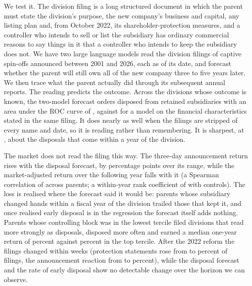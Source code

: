 We test it. The division filing is a long structured document in which the parent must state the division's purpose, the new company's business and capital, any listing plan and, from October 2022, its shareholder-protection measures, and a controller who intends to sell or list the subsidiary has ordinary commercial reasons to say things in it that a controller who intends to keep the subsidiary does not. We have two large language models read the division filings of \NScored{} captive spin-offs announced between 2001 and 2026, each as of its date, and forecast whether the parent will still own all of the new company three to five years later. We then trace what the parent actually did through its subsequent annual reports. The reading predicts the outcome. Across the \NGateOne{} divisions whose outcome is known, the two-model forecast orders disposed from retained subsidiaries with an area under the ROC curve of \AUCPooledLLM{}, against \AUCPooledFin{} for a model on the financial characteristics stated in the same filing. It does nearly as well when the filings are stripped of every name and date, so it is reading rather than remembering. It is sharpest, at \AUCEarlyPooled{}, about the disposals that come within a year of the division.

The market does not read the filing this way. The three-day announcement return rises with the disposal forecast, by \AnnCarSlopePP{} percentage points over its range, while the market-adjusted return over the following year falls with it (a Spearman correlation of \SpearmanScoreBhar{} across \NScoreOneY{} parents; a within-year rank coefficient of \RankSpecThreeCoef{} with controls). The loss is realised where the forecast said it would be: parents whose subsidiary changed hands within a fiscal year of the division trailed those that kept it, and once realised early disposal is in the regression the forecast itself adds nothing. Parents whose controlling block was in the lowest tercile filed divisions that read more strongly as disposals, disposed more often and earned a median one-year return of \LowBlockMedian{} percent against \HighBlockMedian{} percent in the top tercile. After the 2022 reform the filings changed within weeks (protection statements rose from \ProtectPre{} to \ProtectPost{} percent of filings, the announcement reaction from \CarPre{} to \CarPost{} percent), while the disposal forecast and the rate of early disposal show no detectable change over the horizon we can observe.


